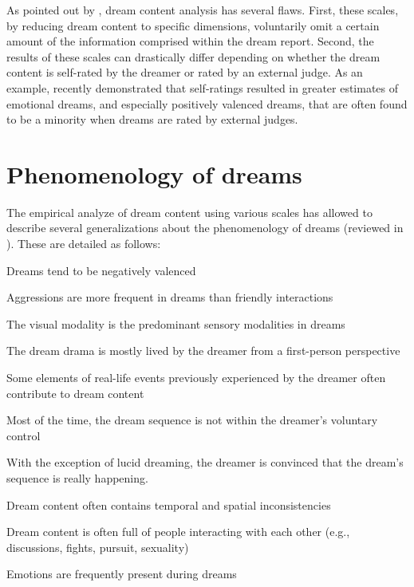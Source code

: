 As pointed out by \citet{schredl_dream_2010}, dream content analysis has several flaws. First, these scales, by reducing dream content to specific dimensions, voluntarily omit a certain amount of the information comprised within the dream report. Second, the results of these scales can drastically differ depending on whether the dream content is self-rated by the dreamer or rated by an external judge. As an example, \citet{sikka_i_2014} recently demonstrated that self-ratings resulted in greater estimates of emotional dreams, and especially positively valenced dreams, that are often found to be a minority when dreams are rated by external judges.

\section{Phenomenology of dreams}
\label{sec:dream-content:pheno}

The empirical analyze of dream content using various scales has allowed to describe several generalizations about the phenomenology of dreams (reviewed in \citealp{hall_content_1966, schwartz_exploration_1999, schredl_characteristics_2010, ruby_experimental_2011, domhoff_finding_2013, windt_dreaming:_2015}). These are detailed as follows:

\begin{my_list_item}
    \item Dreams tend to be negatively valenced
	\item Aggressions are more frequent in dreams than friendly interactions
	\item The visual modality is the predominant sensory modalities in dreams
	\item The dream drama is mostly lived by the dreamer from a first-person perspective
	\item Some elements of real-life events previously experienced by the dreamer often contribute to dream content
	\item Most of the time, the dream sequence is not within the dreamer’s voluntary control
    \item With the exception of lucid dreaming, the dreamer is convinced that the dream's sequence is really happening.
	\item Dream content often contains temporal and spatial inconsistencies
	\item Dream content is often full of people interacting with each other (e.g., discussions, fights, pursuit, sexuality)
	\item Emotions are frequently present during dreams
\end{my_list_item}

